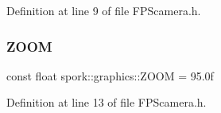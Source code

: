 Definition at line 9 of file F\+P\+Scamera.\+h.

\mbox{\label{namespacespork_1_1graphics_a31df36b1ae6649f4c8f2970b970f4bb3}} 
\subsubsection{\texorpdfstring{Z\+O\+OM}{ZOOM}}
{\footnotesize\ttfamily const float spork\+::graphics\+::\+Z\+O\+OM = 95.\+0f}



Definition at line 13 of file F\+P\+Scamera.\+h.

